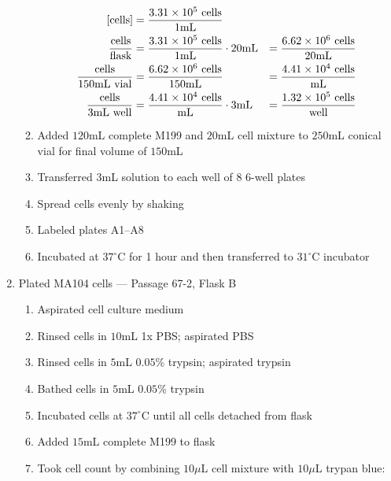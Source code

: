 \begin{enumerate}
\begin{enumerate}
					\begin{align*}
					\text{[cells]} &= \frac{3.31\times 10^{5}\text{ cells}}{1\text{mL}} \\
					\frac{\text{cells}}{\text{flask}} &= \frac{3.31\times 10^{5}\text{ cells}}{1\text{mL}} \cdot 20\text{mL} &= \frac{6.62\times 10^{6}\text{ cells}}{20\text{mL}}\\
					\frac{\text{cells}}{150\text{mL vial}} &= \frac{6.62\times 10^{6}\text{ cells}}{150\text{mL}} &= \frac{4.41\times 10^{4}\text{ cells}}{\text{mL}}\\
					\frac{\text{cells}}{3\text{mL well}} &= \frac{4.41\times 10^{4}\text{ cells}}{\text{mL}} \cdot 3\text{mL} &= \frac{1.32\times 10^{5}\text{ cells}}{\text{well}}\\
					\end{align*}
				\item Added $120$mL complete M199 and $20$mL cell mixture to $250$mL conical vial for final volume of $150$mL
				\item Transferred $3$mL solution to each well of 8 6-well plates
				\item Spread cells evenly by shaking
				\item Labeled plates A1--A8
				\item Incubated at $37^{\circ}$C for 1 hour and then transferred to $31^{\circ}$C incubator
			\end{enumerate}
		\item Plated MA104 cells --- Passage 67-2, Flask B
			\begin{enumerate}
				\item Aspirated cell culture medium
				\item Rinsed cells in $10$mL 1x PBS; aspirated PBS
				\item Rinsed cells in $5$mL $0.05$\% trypsin; aspirated trypsin
				\item Bathed cells in $5$mL $0.05$\% trypsin
				\item Incubated cells at $37^{\circ}$C until all cells detached from flask
				\item Added $15$mL complete M199 to flask
				\item Took cell count by combining $10\mu$L cell mixture with $10\mu$L trypan blue:
				

\end{enumerate}
\end{enumerate}
